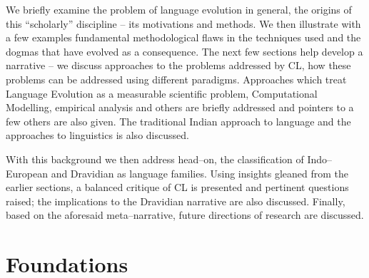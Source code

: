 We briefly examine the problem of language evolution in general, the origins of this “scholarly” discipline – its motivations and methods. We then illustrate with a few examples fundamental methodological flaws in the techniques used and the dogmas that have evolved as a consequence. The next few sections help develop a narrative – we discuss approaches to the problems addressed by CL, how these problems can be addressed using different paradigms. Approaches which treat Language Evolution as a measurable scientific problem, Computational Modelling, empirical analysis and others are briefly addressed and pointers to a few others are also given. The traditional Indian approach to language and the approaches to linguistics is also discussed.

With this background we then address head–on, the classification of Indo–European and Dravidian as language families. Using insights gleaned from the earlier sections, a balanced critique of CL is presented and pertinent questions raised; the implications to the Dravidian narrative are also discussed. Finally, based on the aforesaid meta–narrative, future directions of research are discussed.


\section*{Foundations}

